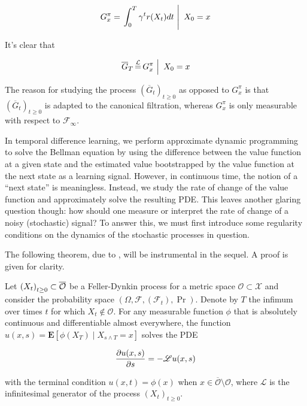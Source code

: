 \begin{equation}
  \label{eq:random-return}
  G_x^\pi = \Conditional{\int_0^T\gamma^tr(X_t)dt}{X_0 = x}
\end{equation}

It's clear that

\begin{equation*}
  \begin{aligned}
    \Conditional{\overline{G}_T \eqlaw G_x^\pi}{X_0=x}
  \end{aligned}
\end{equation*}

The reason for studying the process $(\overline{G}_t)_{t\geq 0}$ as opposed to $G_x^\pi$ is
that $(\overline{G}_t)_{t\geq 0}$ is adapted to the canonical
filtration, whereas $G_x^\pi$ is only measurable with respect to $\mathcal{F}_\infty$.

In temporal difference learning, we perform approximate dynamic
programming to solve the Bellman equation by using the difference
between the value function at a given state and the estimated value
bootstrapped by the value function at the next state as a learning
signal. However, in continuous time, the notion of a ``next state'' is
meaningless. Instead, we study the rate of change of the value
function and approximately solve the resulting PDE. This leaves
another glaring question though: how should one measure or interpret
the rate of change of a noisy (stochastic) signal? To answer this, we
must first introduce some regularity conditions on the dynamics of the
stochastic processes in question.

The following theorem, due to \citet{kolmogoroff1931analytischen}, will be
instrumental in the sequel. A proof is given for clarity.

\begin{theorem}\label{thm:kbe}
  Let $\indexedabove{t}{X}\subset\overline{\mathcal{O}}$ be a Feller-Dynkin
  process for a metric space $\mathcal{O}\subset\mathcal{X}$
  and consider the probability
  space $(\Omega, \mathcal{F}, (\mathcal{F}_t), \Pr)$. Denote by $T$
  the infimum over times $t$ for which $X_t\not\in\mathcal{O}$. For any
  measurable function $\phi$ that is absolutely continuous
  and differentiable almost everywhere, the function $u(x, s) =
  \mathbf{E}[\phi(X_T)\mid X_{s\land T} = x]$ solves the PDE

  \begin{equation}
    \label{eq:kbe}
    \partialderiv{u(x, s)}{s} = -\mathscr{L}u(x, s)
  \end{equation}

  with the terminal condition $u(x, t) = \phi(x)$ when
  $x\in\overline{\mathcal{O}}\setminus\mathcal{O}$, where
  $\mathscr{L}$ is the infinitesimal generator of the process
  $(X_t)_{t\geq 0}$.
\end{theorem}

